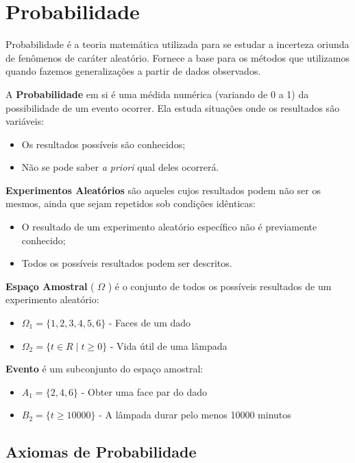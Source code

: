 \chapter{Probabilidade}

Probabilidade é a teoria matemática utilizada para se estudar a incerteza oriunda de fenômenos de caráter aleatório. Fornece a base para os métodos que utilizamos quando fazemos generalizações a partir de dados observados.

A \textbf{Probabilidade} em si é uma médida numérica (variando de 0 a 1) da possibilidade de um evento ocorrer. Ela estuda situações onde os resultados são variáveis:
\begin{itemize}
	\item Os resultados possíveis são conhecidos;
	\item Não se pode saber \textit{a priori} qual deles ocorrerá.
\end{itemize}

\textbf{Experimentos Aleatórios} são aqueles cujos resultados podem não ser os mesmos, ainda que sejam repetidos sob condições idênticas:
\begin{itemize}
	\item O resultado de um experimento aleatório específico não é previamente conhecido;
	\item Todos os possíveis resultados podem ser descritos.
\end{itemize}

\textbf{Espaço Amostral} ( \(\Omega\) ) é o conjunto de todos os possíveis resultados de um experimento aleatório:
\begin{itemize}
	\item \(\Omega_1 = \{ 1, 2, 3, 4, 5, 6 \} \) - Faces de um dado
	\item \(\Omega_2 = \{ t \in R \mid t \geq 0 \} \) - Vida útil de uma lâmpada
\end{itemize}

\textbf{Evento} é um subconjunto do espaço amostral:
\begin{itemize}
	\item \(A_1 = \{ 2, 4, 6 \} \) - Obter uma face par do dado
	\item \(B_2 = \{ t \geq 10000 \} \) - A lâmpada durar pelo menos 10000 minutos
\end{itemize}

\section{Axiomas de Probabilidade}

